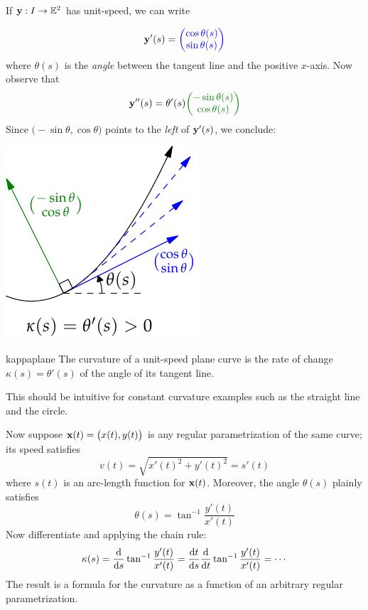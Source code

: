 If $\vy:I\to\E^2$ has unit-speed, we can write\par
\begin{minipage}[t]{0.72\linewidth}\vspace{-12pt}
\[\vy'(s)=\textcolor{blue}{\twovec{\cos\theta(s)}{\sin\theta(s)}}\]
where $\theta(s)$ is the \emph{angle} between the tangent line and the positive $x$-axis. Now observe that
\[\vy''(s)=\theta'(s)\textcolor{Green}{\twovec{-\sin\theta(s)}{\cos\theta(s)}}\]
Since $\bigl(-\sin\theta,\cos\theta\bigr)$ points to the \emph{left} of $\vy'(s)$, we conclude:
\end{minipage}\hfill\begin{minipage}[t]{0.27\linewidth}\vspace{-8pt}
	\flushright \includegraphics[scale=0.95]{regular-planekappa}
\end{minipage}\par


\begin{thm}{}{kappaplane}
The curvature of a unit-speed plane curve is the rate of change $\kappa(s)=\theta'(s)$ of the angle of its tangent line.
\end{thm}

This should be intuitive for constant curvature examples such as the straight line and the circle.

\goodbreak

\smallbreak
Now suppose $\vx(t)=\bigl(x(t),y(t)\bigr)$ is any regular parametrization of the same curve; its speed satisfies
\[v(t)=\sqrt{x'(t)^2+y'(t)^2}=s'(t)\]
where $s(t)$ is an arc-length function for $\vx(t)$. Moreover, the angle $\theta(s)$ plainly satisfies
\[\theta(s)=\tan^{-1}\frac{y'(t)}{x'(t)}\]
Now differentiate and applying the chain rule:
\[\kappa(s)=\diff s\tan^{-1}\frac{y'(t)}{x'(t)} =\diff[t]{s}\diff t\tan^{-1}\frac{y'(t)}{x'(t)} =\cdots\]
The result is a formula for the curvature as a function of an arbitrary regular parametrization.

